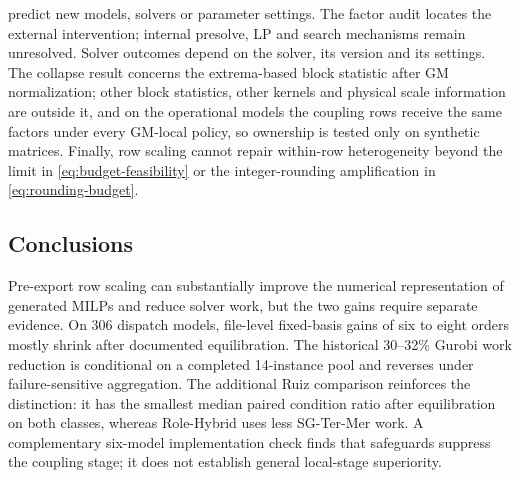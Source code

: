 \documentclass[11pt]{article}
\theoremstyle{definition}
\theoremstyle{remark}
\begin{document}
predict new models, solvers or parameter settings. The factor audit locates the
external intervention; internal presolve, LP and search mechanisms remain unresolved.
Solver outcomes depend on the solver, its version and its settings. The collapse result concerns the extrema-based block
statistic after GM normalization; other block statistics, other kernels and physical scale
information are outside it, and on the operational models the coupling rows receive the same
factors under every GM-local policy, so ownership is tested only on synthetic matrices. Finally, row scaling cannot repair within-row
heterogeneity beyond the limit in \eqref{eq:budget-feasibility} or the integer-rounding
amplification in \eqref{eq:rounding-budget}.

\subsection{Conclusions}
Pre-export row scaling can substantially improve the numerical representation of generated
MILPs and reduce solver work, but the two gains require separate evidence. On 306 dispatch
models, file-level fixed-basis gains of six to eight orders mostly shrink after documented
equilibration. The historical 30--32\% Gurobi work reduction is conditional on a completed
14-instance pool and reverses under failure-sensitive aggregation. The additional Ruiz
comparison reinforces the distinction: it has the smallest median paired condition ratio after equilibration on both classes, whereas Role-Hybrid uses less SG-Ter-Mer work. A complementary six-model implementation check finds that safeguards suppress the
coupling stage; it does not establish general local-stage superiority.
\end{document}

